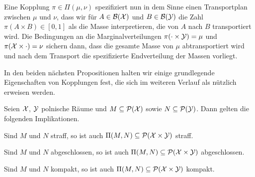 \documentclass[../thesis/thesis.tex]{subfiles}
\begin{document}
	Eine Kopplung $\pi \in \Pi(\mu, \nu)$ spezifiziert nun in dem Sinne einen Transportplan zwischen $\mu$ und $\nu$, dass wir für $A \in \mathcal{B}(\mathcal{X})$ und $B \in \mathcal{B}(\mathcal{Y})$ die Zahl
	$\pi(A \times B) \in [0, 1]$ als die Masse interpretieren, die von $A$ nach $B$ transportiert wird. Die Bedingungen an die Marginalverteilungen $\pi(\cdot \times \mathcal{Y}) = \mu$ und $\pi(\mathcal{X} \times \cdot) = \nu$ sichern dann, dass die gesamte Masse von $\mu$ abtransportiert wird und nach dem Transport die spezifizierte Endverteilung der Massen vorliegt.
	
	
	
	In den beiden nächsten Propositionen halten wir einige grundlegende Eigenschaften von Kopplungen fest, die sich im weiteren Verlauf als nützlich erweisen werden.

	\begin{Proposition}
		\label{proposition:eigenschaften_kopplungen}
		Seien $\mathcal{X}$, $\mathcal{Y}$ polnische Räume und $M \subseteq \mathcal{P}(\mathcal{X})$ sowie $N \subseteq \mathcal{P}(\mathcal{Y})$. Dann gelten die folgenden Implikationen.
		\begin{enumeratethm}
			\item Sind $M$ und $N$ straff, so ist auch $\Pi(M, N) \subseteq \mathcal{P}(\mathcal{X} \times \mathcal{Y})$ straff.
			\item Sind $M$ und $N$ abgeschlossen, so ist auch $\Pi(M, N) \subseteq \mathcal{P}(\mathcal{X} \times \mathcal{Y})$ abgeschlossen.
			\item Sind $M$ und $N$ kompakt, so ist auch $\Pi(M, N) \subseteq \mathcal{P}(\mathcal{X} \times \mathcal{Y})$ kompakt.
		\end{enumeratethm}
	\end{Proposition}
\end{document}
